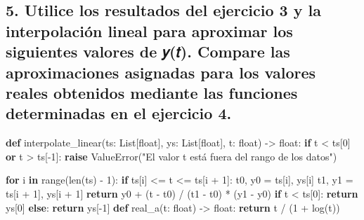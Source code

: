 \documentclass[
  letterpaper,
  DIV=11,
  numbers=noendperiod]{scrartcl}
\newenvironment{Shaded}{\begin{snugshade}}{\end{snugshade}}
\newcommand{\BuiltInTok}[1]{\textcolor[rgb]{0.00,0.23,0.31}{#1}}
\newcommand{\ControlFlowTok}[1]{\textcolor[rgb]{0.00,0.23,0.31}{\textbf{#1}}}
\newcommand{\DecValTok}[1]{\textcolor[rgb]{0.68,0.00,0.00}{#1}}
\newcommand{\KeywordTok}[1]{\textcolor[rgb]{0.00,0.23,0.31}{\textbf{#1}}}
\newcommand{\NormalTok}[1]{\textcolor[rgb]{0.00,0.23,0.31}{#1}}
\newcommand{\OperatorTok}[1]{\textcolor[rgb]{0.37,0.37,0.37}{#1}}
\newcommand{\PreprocessorTok}[1]{\textcolor[rgb]{0.68,0.00,0.00}{#1}}
\newcommand{\StringTok}[1]{\textcolor[rgb]{0.13,0.47,0.30}{#1}}
\begin{document}
\subsection{5. Utilice los resultados del ejercicio 3 y la interpolación
lineal para aproximar los siguientes valores de 𝑦(𝑡). Compare las
aproximaciones asignadas para los valores reales obtenidos mediante las
funciones determinadas en el ejercicio
4.}\label{utilice-los-resultados-del-ejercicio-3-y-la-interpolaciuxf3n-lineal-para-aproximar-los-siguientes-valores-de-ux1d466ux1d461.-compare-las-aproximaciones-asignadas-para-los-valores-reales-obtenidos-mediante-las-funciones-determinadas-en-el-ejercicio-4.}

\begin{Shaded}
\begin{Highlighting}[]
\KeywordTok{def}\NormalTok{ interpolate\_linear(ts: List[}\BuiltInTok{float}\NormalTok{], ys: List[}\BuiltInTok{float}\NormalTok{], t: }\BuiltInTok{float}\NormalTok{) }\OperatorTok{{-}\textgreater{}} \BuiltInTok{float}\NormalTok{:}
    \ControlFlowTok{if}\NormalTok{ t }\OperatorTok{\textless{}}\NormalTok{ ts[}\DecValTok{0}\NormalTok{] }\KeywordTok{or}\NormalTok{ t }\OperatorTok{\textgreater{}}\NormalTok{ ts[}\OperatorTok{{-}}\DecValTok{1}\NormalTok{]:}
        \ControlFlowTok{raise} \PreprocessorTok{ValueError}\NormalTok{(}\StringTok{"El valor t está fuera del rango de los datos"}\NormalTok{)}
    
    \ControlFlowTok{for}\NormalTok{ i }\KeywordTok{in} \BuiltInTok{range}\NormalTok{(}\BuiltInTok{len}\NormalTok{(ts) }\OperatorTok{{-}} \DecValTok{1}\NormalTok{):}
        \ControlFlowTok{if}\NormalTok{ ts[i] }\OperatorTok{\textless{}=}\NormalTok{ t }\OperatorTok{\textless{}=}\NormalTok{ ts[i }\OperatorTok{+} \DecValTok{1}\NormalTok{]:}
\NormalTok{            t0, y0 }\OperatorTok{=}\NormalTok{ ts[i], ys[i]}
\NormalTok{            t1, y1 }\OperatorTok{=}\NormalTok{ ts[i }\OperatorTok{+} \DecValTok{1}\NormalTok{], ys[i }\OperatorTok{+} \DecValTok{1}\NormalTok{]}
            \ControlFlowTok{return}\NormalTok{ y0 }\OperatorTok{+}\NormalTok{ (t }\OperatorTok{{-}}\NormalTok{ t0) }\OperatorTok{/}\NormalTok{ (t1 }\OperatorTok{{-}}\NormalTok{ t0) }\OperatorTok{*}\NormalTok{ (y1 }\OperatorTok{{-}}\NormalTok{ y0)}
    \ControlFlowTok{if}\NormalTok{ t }\OperatorTok{\textless{}}\NormalTok{ ts[}\DecValTok{0}\NormalTok{]:}
        \ControlFlowTok{return}\NormalTok{ ys[}\DecValTok{0}\NormalTok{]}
    \ControlFlowTok{else}\NormalTok{:}
        \ControlFlowTok{return}\NormalTok{ ys[}\OperatorTok{{-}}\DecValTok{1}\NormalTok{]}
\KeywordTok{def}\NormalTok{ real\_a(t: }\BuiltInTok{float}\NormalTok{) }\OperatorTok{{-}\textgreater{}} \BuiltInTok{float}\NormalTok{:}
    \ControlFlowTok{return}\NormalTok{ t }\OperatorTok{/}\NormalTok{ (}\DecValTok{1} \OperatorTok{+}\NormalTok{ log(t))}


\end{Highlighting}
\end{Shaded}
\end{document}
